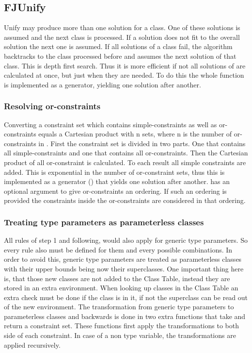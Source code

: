\subsection{FJUnify}

Unify may produce more than one solution for a class. One of these solutions is assumed and the next class is processed. If a solution does not fit to the overall solution the next one is assumed.
If all solutions of a class fail, the algorithm backtracks to the class processed before and assumes the next solution of that class. This is depth first search. Thus it is more efficient if not all solutions of  are calculated at once, but just when they are needed.
To do this the whole function  is implemented as a generator, yielding one solution after another.

\subsubsection{Resolving or-constraints}
Converting a constraint set  which contains simple-constraints as well as or-constraints equals a Cartesian product with n sets, where n is the number of or-constraints in .
First the constraint set  is divided in two parts. One that contains all simple-constraints and one that contains all or-constraints.
Then the Cartesian product of all or-constraint is calculated. To each result all simple constraints are added. This is exponential in the number of or-constraint sets, thus this is implemented as a generator () that yields one solution after another.
 has an optional argument to give or-constraints an ordering. If such an ordering is provided the constraints inside the or-constraints are considered in that ordering.

\subsubsection{Treating type parameters as parameterless classes}
All rules of step 1 and following, would also apply for generic type parameters. So every rule also must be defined for them and every possible combinations. In order to avoid this, generic type parameters are treated as parameterless classes with their upper bounds being now their superclasses. One important thing here is, that those new classes are not added to the Class Table, instead they are stored in an extra environment. When looking up classes in the Class Table an extra check must be done if the class is in it, if not the superclass can be read out of the new environment.
The transformation from  generic type parameters to parameterless classes and backwards is done in two extra functions that take and return a constraint set.
These functions first apply the transformations to both side of each constraint. In case of a non type variable, the transformations are applied recursively.

